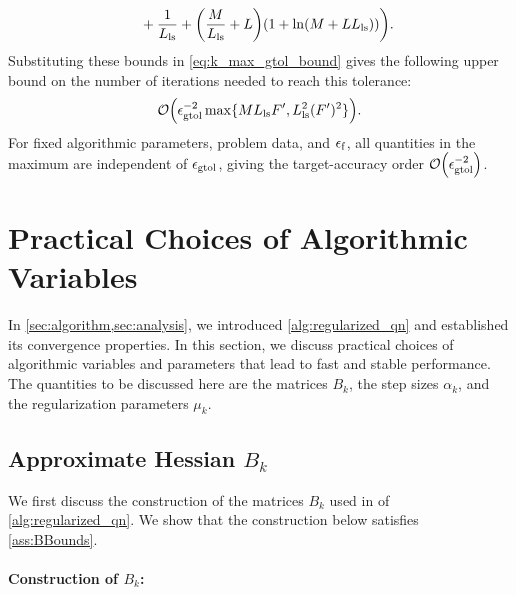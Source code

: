 \documentclass[journal_revised_MPC]{subfiles}
\begin{document}
\begin{MPCchange}
\begin{align*}
    &\qquad{}+\frac{1}{L_{\mathrm{ls}}}+\qty(\frac{M}{L_{\mathrm{ls}}} + L)\qty(1+\ln(M+L L_{\mathrm{ls}}))\bigg).
\end{align*}
Substituting these bounds in \cref{eq:k_max_gtol_bound} gives the following upper bound on the number of iterations needed to reach this tolerance:
\begin{equation*}
    \order{\gtol^{-2}\max\{ML_{\mathrm{ls}}F',L_{\mathrm{ls}}^2(F')^2\}}.
\end{equation*}
For fixed algorithmic parameters, problem data, and $\epsilon_\mathrm{f}$, all quantities in the maximum are independent of $\epsilon_{\mathrm{gtol}}$, giving the target-accuracy order $\order{\gtol^{-2}}$.
\end{MPCchange}

\section{Practical Choices of Algorithmic Variables}\label{sec:proposed_choice}

In \cref{sec:algorithm,sec:analysis}, we introduced \cref{alg:regularized_qn} and established its convergence properties.
In this section, we discuss practical choices of algorithmic variables and parameters that lead to fast and stable performance.
The quantities to be discussed here are the matrices $B_k$, the step sizes $\alpha_k$, and the regularization parameters $\mu_k$.

\subsection{Approximate Hessian \texorpdfstring{$B_k$}{B k}}\label{sec:proposed_choice_Bk}

We first discuss the construction of the matrices $B_k$ used in  of \cref{alg:regularized_qn}.
We show that the construction below satisfies \cref{ass:BBounds}.

\paragraph{Construction of $B_k$: }
\end{document}
